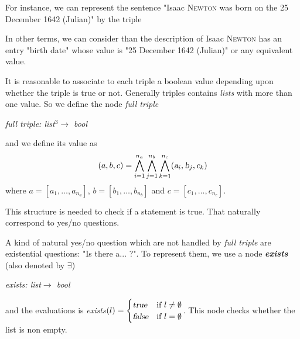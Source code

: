 For instance, we can represent the sentence "Isaac \textsc{Newton} was born on the 25 December 1642 (Julian)" by the triple
\begin{figure}[!ht]
    \centering
\end{figure}
\FloatBarrier
In other terms, we can consider than the description of Isaac \textsc{Newton} has an entry "birth date" whose value is "25 December 1642 (Julian)" or any equivalent value.

It is reasonable to associate to each triple a boolean value depending upon whether the triple is true or not. Generally triples contains \textsl{lists} with more than one value. So we define the node \textsl{full triple} 
\begin{center}
\textsl{full triple: list$^3\rightarrow$ bool}
\end{center}
and we define its value as $$(a,b,c)=\bigwedge_{i=1}^{n_a}\bigwedge_{j=1}^{n_b}\bigwedge_{k=1}^{n_c} (\textsl{a}_i,\textsl{b}_j,\textsl{c}_k)$$where $a=[a_1,\ldots,a_{n_a}]$, $b=[b_1,\ldots,b_{n_b}]$ and $c=[c_1,\ldots,c_{n_c}]$.

This structure is needed to check if a statement is true. That naturally correspond to yes/no questions.

A kind of natural yes/no question which are not handled by \textsl{full triple} are existential questions: "Is there a... ?". To represent them, we use a node \textsl{\bf exists} (also denoted by $\exists$)
\begin{center}
\textsl{exists: list$\rightarrow$ bool}
\end{center}
and the evaluations is \textsl{exists$(l) = \begin{cases}
\textsl{true} & \text{if }l\neq\emptyset\\
\textsl{false} & \text{if }l=\emptyset
\end{cases}$}. This node checks whether the list is non empty.

